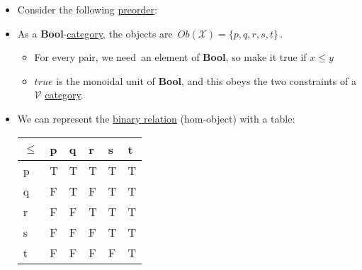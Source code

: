 \begin{itemize}
    \item  Consider the following \href{doc/1 math/Seven Sketches in Compositionality/Chapter 1: Generative Effects/3 Preorders/1 Preorder}{preorder}: 
    \item As a \textbf{Bool}-\href{doc/1 math/Seven Sketches in Compositionality/Chapter 2: Resource theories/3 Enrichment/1 V-categories/1 V-category}{category}, the objects are \,$Ob(\mathcal{X})=\{p,q,r,s,t\}$\,.
          \begin{itemize}
            \item For every pair, we need \,an element of \textbf{Bool}, so make it true if $x\leq y$\,
            \item $true$ is the monoidal unit of \textbf{Bool}, and this obeys the two constraints of a $\mathcal{V}$ \href{doc/1 math/Seven Sketches in Compositionality/Chapter 2: Resource theories/3 Enrichment/1 V-categories/1 V-category}{category}.
          \end{itemize}
    \item We can represent the \href{doc/1 math/Seven Sketches in Compositionality/Chapter 1: Generative Effects/2 What is order/Relation}{binary relation} (hom-object) with a table:\,
          \begin{minipage}{0.48\textwidth}
            \begin{tabular}{|l|l|l|l|l|l|}
              $\leq$ & p & q & r & s & t \\  \hline
              p      & T & T & T & T & T \\ \hline
              q      & F & T & F & T & T \\ \hline
              r      & F & F & T & T & T \\ \hline
              s      & F & F & F & T & T \\ \hline
              t      & F & F & F & F & T
            \end{tabular}
          \end{minipage}\,
  \end{itemize}